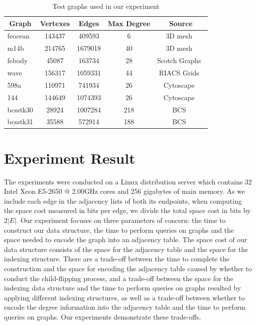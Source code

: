 \documentclass[12pt,glossary]{dalthesis}
\begin{document}
\begin{table}[ht]
\centering
\caption{ Test graphs used in our experiment }
\label{graph-list}
\begin{tabular}{|l||c|c|c|c|}
\hline
\multicolumn{1}{|c||}{Graph} & Vertexes & Edges   & Max Degree & Source        \\ \hline
feocean                   & 143437   & 409593  & 6          & 3D mesh~\cite{3DMESH}        \\
m14b                      & 214765   & 1679018 & 40         & 3D mesh~\cite{3DMESH}       \\
febody                    & 45087    & 163734  & 28         & Scotch Graphs~\cite{Scotch} \\ 
wave                      & 156317   & 1059331 & 44         & RIACS Grids~\cite{RIACS}    \\
598a                      & 110971   & 741934  & 26         & Cytoscape~\cite{Cytoscape}      \\
144                       & 144649   & 1074393 & 26         & Cytoscape~\cite{Cytoscape}     \\
bcsstk30                  & 28924    & 1007284 & 218        & BCS~\cite{Matrix}    \\
bcsstk31                  & 35588    & 572914  & 188        & BCS~\cite{Matrix}     \\ \hline
\end{tabular}
\end{table}


\section{Experiment Result} 
The experiments were conducted on a Linux distribution server which contains 32 Intel Xeon E5-2650 @ 2.00GHz cores and 256 gigabytes of main memory. As we include each edge in the adjacency lists of both its endpoints, when computing the space cost measured in bits per edge, we divide the total space cost in bits by $2|E|$. Our experiment focuses on three parameters of concern: the time to construct our data structure, the time to perform queries on graphs and the space needed to encode the graph into an adjacency table. The space cost of our data structure consists of the space for the adjacency table and the space for the indexing structure. There are a trade-off between the time to complete the construction and the space for encoding the adjacency table caused by whether to conduct the child-flipping process, and a trade-off between the space for the indexing data structure and the time to perform queries on graphs resulted by applying different indexing structures, as well as a trade-off between whether to encode the degree information into the adjacency table and the time to perform queries on graphs. Our experiments demonstrate these trade-offs.
\end{document}
